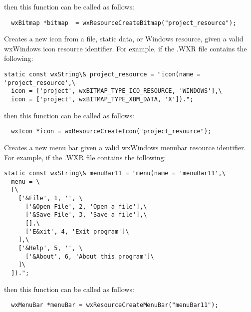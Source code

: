 then this function can be called as follows:

\begin{verbatim}
  wxBitmap *bitmap  = wxResourceCreateBitmap("project_resource");
\end{verbatim}



Creates a new icon from a file, static data, or Windows resource, given a valid
wxWindows icon resource identifier. For example, if the .WXR file contains
the following:

\begin{verbatim}
static const wxString\& project_resource = "icon(name = 'project_resource',\
  icon = ['project', wxBITMAP_TYPE_ICO_RESOURCE, 'WINDOWS'],\
  icon = ['project', wxBITMAP_TYPE_XBM_DATA, 'X']).";
\end{verbatim}

then this function can be called as follows:

\begin{verbatim}
  wxIcon *icon = wxResourceCreateIcon("project_resource");
\end{verbatim}



Creates a new menu bar given a valid wxWindows menubar resource
identifier. For example, if the .WXR file contains the following:

\begin{verbatim}
static const wxString\& menuBar11 = "menu(name = 'menuBar11',\
  menu = \
  [\
    ['&File', 1, '', \
      ['&Open File', 2, 'Open a file'],\
      ['&Save File', 3, 'Save a file'],\
      [],\
      ['E&xit', 4, 'Exit program']\
    ],\
    ['&Help', 5, '', \
      ['&About', 6, 'About this program']\
    ]\
  ]).";
\end{verbatim}

then this function can be called as follows:

\begin{verbatim}
  wxMenuBar *menuBar = wxResourceCreateMenuBar("menuBar11");
\end{verbatim}




